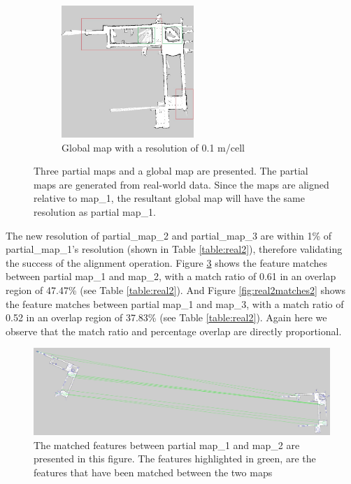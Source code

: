 \begin{figure}[H]
\begin{subfigure}{0.5\textwidth}
\centering
\includegraphics[width=0.9\linewidth, height=5cm]{figs/real_world_results/c/final_map_marked.jpg}
\caption{Global map with a resolution of 0.1 m/cell}
\label{fig:real24}
\end{subfigure}
\caption{Three partial maps and a global map are presented. The partial maps are generated from real-world data. Since the maps are aligned relative to map\_1, the resultant global map will have the same resolution as partial map\_1.}
\label{fig:real2}
\end{figure}

The new resolution of partial\_map\_2 and partial\_map\_3 are within 1\% of partial\_map\_1's resolution (shown in Table \ref{table:real2}), therefore validating the success of the alignment operation. Figure \ref{fig:real2matches1} shows the feature matches between partial map\_1 and map\_2, with a match ratio of 0.61 in an overlap region of 47.47\% (see Table \ref{table:real2}). And Figure \ref{fig:real2matches2} shows the feature matches between partial map\_1 and map\_3, with a match ratio of 0.52 in an overlap region of 37.83\% (see Table \ref{table:real2}). Again here we observe that the match ratio and percentage overlap are directly proportional.

\begin{figure}[H]
    \centering
    \includegraphics[width=1\textwidth]{figs/real_world_results/c/matchesPartialMap1Map2.jpg}
    \caption{The matched features between partial map\_1 and map\_2 are presented in this figure. The features highlighted in green, are the features that have been matched between the two maps}
    \label{fig:real2matches1}
\end{figure} 


